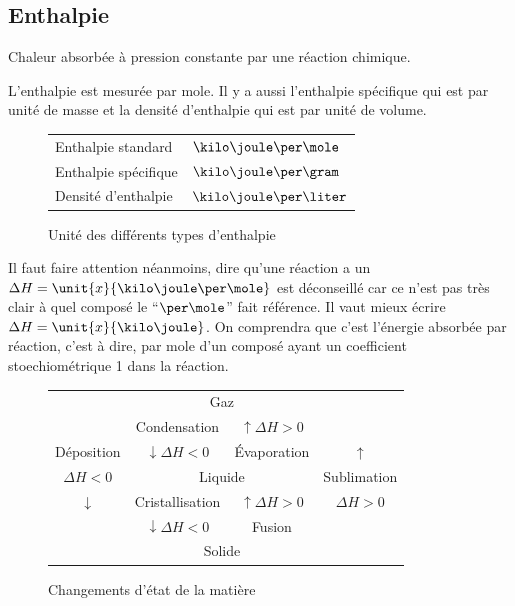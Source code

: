 \documentclass[11pt,a4paper,french]{article}
\begin{document}
\subsection{Enthalpie} \label{sec:DH}
Chaleur absorbée à pression constante par une réaction chimique.

L'enthalpie est mesurée par mole.
Il y a aussi l'enthalpie spécifique qui est par unité de masse et la densité d'enthalpie qui est par unité de volume.

\begin{figure}[h!]
	\begin{center}
		\begin{tabular}{|ll|}
			\hline
			Enthalpie standard & $\kilo\joule\per\mole$\\
			Enthalpie spécifique & $\kilo\joule\per\gram$\\
			Densité d'enthalpie & $\kilo\joule\per\liter$\\
			\hline
		\end{tabular}
	\end{center}
	\label{fig:enthunit}
	\caption{Unité des différents types d'enthalpie}
\end{figure}

Il faut faire attention néanmoins, dire qu'une réaction a un $\Delta H = \unit{x}{\kilo\joule\per\mole}$ est déconseillé car ce n'est pas très clair à quel composé le ``$\per\mole$'' fait référence.
Il vaut mieux écrire $\Delta H = \unit{x}{\kilo\joule}$.
On comprendra que c'est l'énergie absorbée par réaction, c'est à dire, par mole d'un composé ayant un coefficient stoechiométrique 1 dans la réaction.

\begin{figure}[h!]
	\begin{center}
		\begin{tabular}{|c|cc|c|}
			\cline{1-1} \cline{4-4}
			& \multicolumn{2}{c|}{Gaz} & \\
			\cline{2-3}
			\multicolumn{1}{|c}{} & Condensation & \multicolumn{1}{c}{$\uparrow \Delta H > 0$} & \\
			\multicolumn{1}{|c}{Déposition} & $\downarrow \Delta H < 0$ & \multicolumn{1}{c}{\'Evaporation} & $\uparrow$\\
			\cline{2-3}
			$\Delta H < 0$ & \multicolumn{2}{c|}{Liquide} & Sublimation\\
			\cline{2-3}
			\multicolumn{1}{|c}{$\downarrow$} & Cristallisation & \multicolumn{1}{c}{$\uparrow \Delta H > 0$} & $\Delta H > 0$\\
			\multicolumn{1}{|c}{} & $\downarrow \Delta H < 0$ & \multicolumn{1}{c}{Fusion} & \\
			\cline{2-3}
			& \multicolumn{2}{c|}{Solide} &\\
			\cline{1-1} \cline{4-4}
		\end{tabular}
	\end{center}
	\label{fig:state}
	\caption{Changements d'état de la matière}
\end{figure}
\end{document}
